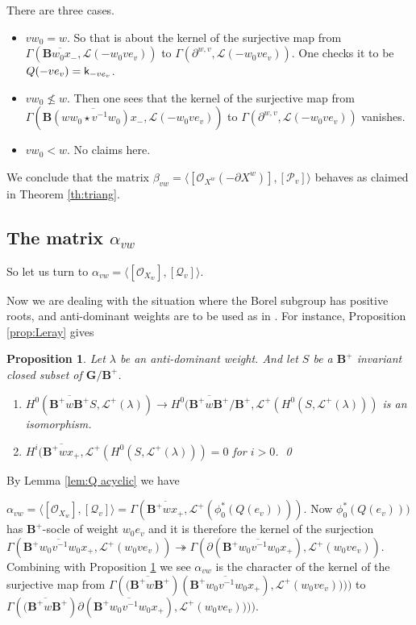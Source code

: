 \documentclass[sn-mathphys-num]{sn-jnl}%
\newcommand\tP{{\mathcal P}}
\newcommand\tQ{{\mathcal Q}}
\newcommand{\Oo}{\mathcal O}
\newcommand{\Ll}{\mathcal L}
\newcommand{\sk}{{\sf k}}
\newcommand{\onto}{{\twoheadrightarrow}}
\newcommand{\bg}{\mathbf G}
\newcommand{\fb}{\mathbf B}
\newcommand{\fX}{{ X}}
\newtheorem{proposition}[theorem]{Proposition}
\theoremstyle{definition}
\begin{document}
There are three cases.

\begin{itemize}
\item $vw_0=w$. So that is about  the kernel of the surjective map from $\Gamma(\overline{{\fb}w_0x_-},\Ll(-w_0ve_v))$ to $\Gamma(\partial^{w,v},\Ll(-w_0ve_v))$.
One checks it to be $Q(-ve_v)=\sk_{-ve_v}$.
\item $vw_0\nleq w$. Then one sees that 
the kernel of the surjective map from $\Gamma(\overline{{\fb}(ww_0\star v^{-1}w_0)x_-},\Ll(-w_0ve_v))$ to $\Gamma(\partial^{w,v},\Ll(-w_0ve_v))$ vanishes.
\item $vw_0< w$. No claims here.
\end{itemize}

We conclude that the matrix 
 $\beta_{vw}=\langle  [\Oo_{\fX^w}(-\partial \fX^w)],[\tP_v]\rangle$ behaves  as claimed in Theorem \ref{th:triang}.

\subsection{The matrix $\alpha_{vw}$}\label{subsec:alpha}

So let us turn to $\alpha_{vw}=\langle [\Oo_{\fX_w}],[\tQ_v]\rangle$.

Now we are dealing with the situation where the Borel subgroup has positive roots, and anti-dominant weights
are to be used as in \cite{WvdKTata}. For instance,  Proposition \ref{prop:Leray} gives
 \begin{proposition}\label{prop:Leray+}
  Let $\lambda$ be an anti-dominant weight. And let $S$ be a ${\fb}^+$ invariant closed subset of $ \bg /{\fb}^+$.
   \begin{enumerate} 
 \item $H^0(\overline{{\fb}^+w{\fb}^+} S,\Ll^+(\lambda))\to H^0({\overline{{\fb}^+w{\fb}^+}/{\fb}^+},\Ll^+(H^0(S,\Ll^+(\lambda)))$ is an isomorphism.
 \label{Leray+1}
  \item  $H^i({\overline{{\fb}^+wx_+}},\Ll^+(H^0(S,\Ll^+(\lambda)))=0$ for $i>0$.
  \label{Leray+3}
 \qed\end{enumerate}
 
 \end{proposition}


By Lemma \ref{lem:Q acyclic} we have 

$\alpha_{vw}=\langle [\Oo_{\fX_w}],[\tQ_v]\rangle=\Gamma(\overline{{\fb}^+wx_+},\Ll^+(\phi_0^* (Q(e_v))))$. Now 
$\phi_0^* (Q(e_v)))$ has $\fb^+$-socle of weight $w_0e_v$ and it is therefore the kernel of the surjection
$\Gamma(\overline{{\fb}^+w_0v^{-1}w_0x_+},\Ll^+(w_0ve_v))\onto\Gamma(\partial(\overline{{\fb}^+w_0v^{-1}w_0x_+}),\Ll^+(w_0ve_v)).$
Combining with Proposition \ref{prop:Leray+}
we see  $\alpha_{vw}$ is the character of the kernel of the surjective map from
$\Gamma(\overline{({\fb}^+w{\fb}^+})(\overline{{\fb}^+w_0v^{-1}w_0x_+}),\Ll^+(w_0ve_v))))$ to $\Gamma(\overline{({\fb}^+w{\fb}^+})\partial(\overline{{\fb}^+w_0v^{-1}w_0x_+}),\Ll^+(w_0ve_v))))$.
\end{document}
